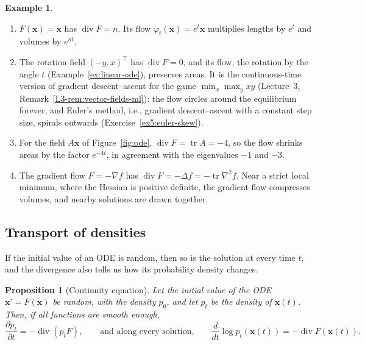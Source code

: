 \documentclass[11pt]{article}
\theoremstyle{definition}
\newtheorem{example}[definition]{Example}
\theoremstyle{plain}
\newtheorem{proposition}[definition]{Proposition}
\theoremstyle{remark}
\DeclareMathOperator{\tr}{tr}
\DeclareMathOperator{\Div}{div}
\begin{document}
\begin{example}\label{ex:flow-volumes}
    \begin{enumerate}
        \item $F(\mathbf{x}) = \mathbf{x}$ has $\Div F = n$. Its flow $\varphi_t(\mathbf{x}) = e^t\mathbf{x}$ multiplies lengths by $e^t$ and volumes by $e^{nt}$.
        \item The rotation field $(-y, x)^\top$ has $\Div F = 0$, and its flow, the rotation by the angle $t$ (Example~\ref{ex:linear-ode}), preserves areas. It is the continuous-time version of gradient descent--ascent for the game $\min_x\max_y xy$ (Lecture~3, Remark~\ref{L3-rem:vector-fields-ml}): the flow circles around the equilibrium forever, and Euler's method, i.e., gradient descent--ascent with a constant step size, spirals outwards (Exercise~\ref{ex5:euler-skew}).
        \item For the field $A\mathbf{x}$ of Figure~\ref{fig:ode}, $\Div F = \tr A = -4$, so the flow shrinks areas by the factor $e^{-4t}$, in agreement with the eigenvalues $-1$ and $-3$.
        \item The gradient flow $F = -\nabla f$ has $\Div F = -\Delta f = -\tr\nabla^2 f$. Near a strict local minimum, where the Hessian is positive definite, the gradient flow compresses volumes, and nearby solutions are drawn together.
    \end{enumerate}
\end{example}

\subsection{Transport of densities}

If the initial value of an ODE is random, then so is the solution at every time $t$, and the divergence also tells us how its probability density changes.

\begin{proposition}[Continuity equation]\label{prop:continuity}
    Let the initial value of the ODE $\mathbf{x}' = F(\mathbf{x})$ be random, with the density $p_0$, and let $p_t$ be the density of $\mathbf{x}(t)$. Then, if all functions are smooth enough,
    \[\frac{\partial p_t}{\partial t} = -\Div(p_tF), \qquad \text{and along every solution,} \qquad \frac{d}{dt}\log p_t(\mathbf{x}(t)) = -\Div F(\mathbf{x}(t)).\]
\end{proposition}
\end{document}
